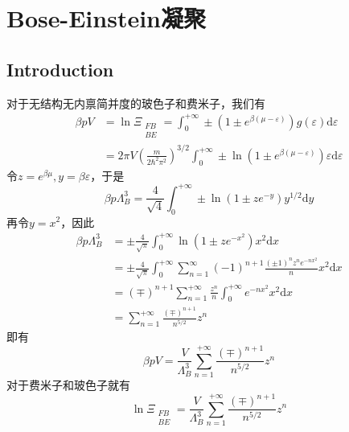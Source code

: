 \chapter{Bose-Einstein凝聚} %
\label{cha:Bose-Einstein凝聚}
\section{Introduction} %
\label{sec:Introduction 9}
对于无结构无内禀简并度的玻色子和费米子，我们有\begin{equation}
    \begin{aligned}
        \beta p V &=\ln \Xi_{\substack{FB\\BE}}= \int_{0}^{+\infty}\pm \left(1\pm e^{\beta(\mu-\varepsilon)}\right)  g(\varepsilon) \mathrm{d}\varepsilon\\
        &=2\pi V \left(\frac{m}{2\hbar^2 \pi^2}\right)^{3/2}\int_{0}^{+\infty} \pm \ln(1\pm e^{\beta(\mu-\varepsilon)}) \varepsilon \mathrm{d}\varepsilon
    \end{aligned}
\end{equation}
令$z=e^{\beta\mu},y=\beta \varepsilon$，于是\begin{equation}
    \beta p\Lambda_B^3 =\frac{4}{\sqrt{4}} \int_{0}^{+\infty} \pm \ln(1\pm ze^{-y})y^{1/2} \mathrm{d}y
\end{equation}
再令$y=x^2$，因此\begin{equation}
    \begin{aligned}
        \beta p\Lambda_B^3 &=\pm \frac{4}{\sqrt\pi} \int_{0}^{+\infty} \ln(1\pm ze^{-x^2})x^2 \mathrm{d}x\\
        &=\pm \frac{4}{\sqrt\pi} \int_{0}^{+\infty} \sum_{n=1}^{\infty}  (-1)^{n+1} \frac{(\pm1)^n z^n e^{-n x^2}}{n}x^2\mathrm{d}x\\
        & =(\mp)^{n+1} \sum_{n=1}^{+\infty} \frac{z^n}{n}  \int_{0}^{+\infty} e^{-n x^2}x^2\mathrm{d}x\\
        & = \sum_{n=1}^{+\infty}  \frac{(\mp)^{n+1} }{n^{5/2}} z^n 
    \end{aligned}
\end{equation}
即有\begin{equation}
    \beta p V = \frac{V}{\Lambda_B^3} \sum_{n=1}^{+\infty}  \frac{(\mp)^{n+1} }{n^{5/2}} z^n 
\end{equation}
对于费米子和玻色子就有\begin{equation}
    \ln \Xi_{\substack{FB\\BE}}=\frac{V}{\Lambda_B^3} \sum_{n=1}^{+\infty}  \frac{(\mp)^{n+1} }{n^{5/2}} z^n
\end{equation}
